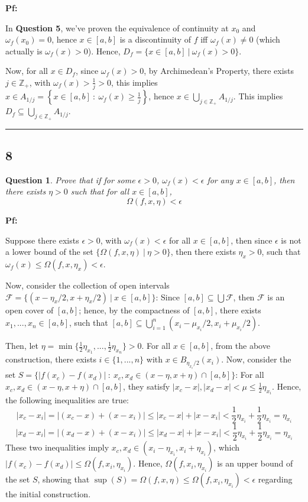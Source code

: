 \documentclass{article}
\newtheorem{question}{Question}
\begin{document}
\textbf{Pf:}

In \textbf{Question 5}, we've proven the equivalence of continuity at $x_0$ and $\omega_f(x_0)=0$, hence $x\in[a,b]$ is a discontinuity of $f$
iff $\omega_f(x)\neq 0$ (which actually is $\omega_f(x)>0$). Hence, $D_f=\{x\in[a,b]\ |\ \omega_f(x)>0\}$.

Now, for all $x\in D_f$, since $\omega_f(x)>0$, by Archimedean's Property, there exists $j\in\mathbb{Z}_+$, with $\omega_f(x)>\frac{1}{j}>0$,
this implies $x\in A_{1/j}=\left\{x\in[a,b]\ :\ \omega_f(x)\geq \frac{1}{j}\right\}$, hence $x\in \bigcup_{j\in\mathbb{Z}_+}A_{1/j}$. This implies $D_f\subseteq \bigcup_{j\in\mathbb{Z}_+}A_{1/j}$.

\hfill

\rule{15.5cm}{0.1mm}

\break

\subsection*{8}
\begin{myBox2}[]{}
    \begin{question}
        Prove that if for some $\epsilon>0$, $\omega_f(x)<\epsilon$ for any $x\in[a,b]$, then
        there exists $\eta>0$ such that for all $x\in[a,b]$,
        $$\Omega(f,x,\eta)<\epsilon$$
    \end{question}
\end{myBox2}

\textbf{Pf:}

Suppose there exists $\epsilon>0$, with $\omega_f(x)<\epsilon$ for all $x\in[a,b]$, then since $\epsilon$ is not a lower bound of the set $\{\Omega(f,x,\eta)\ |\ \eta>0\}$,
then there exists $\eta_x>0$, such that $\omega_f(x)\leq \Omega(f,x,\eta_x)<\epsilon$.

Now, consider the collection of open intervals $\mathcal{F}=\{(x-\eta_x/2,x+\eta_x/2)\ |\ x\in[a,b]\}$: Since $[a,b]\subseteq \bigcup\mathcal{F}$, then $\mathcal{F}$ is an open cover of $[a,b]$;
hence, by the compactness of $[a,b]$, there exists $x_1,...,x_n\in [a,b]$, such that $[a,b]\subseteq \bigcup_{i=1}^{n}(x_i-\mu_{x_i}/2,x_i+\mu_{x_i}/2)$.

\hfill

Then, let $\eta=\min\{\frac{1}{2}\eta_{x_1},...,\frac{1}{2}\eta_{x_n}\}>0$. For all $x\in[a,b]$, from the above construction, there exists $i\in\{1,...,n\}$ with $x\in B_{\eta_{x_i}/2}(x_i)$.
Now, consider the set $S=\{|f(x_c)-f(x_d)|\ :\ x_c,x_d\in (x-\eta,x+\eta)\cap [a,b]\}$:
For all $x_c,x_d\in (x-\eta,x+\eta)\cap [a,b]$, they satisfy $|x_c-x|,|x_d-x|<\mu \leq \frac{1}{2}\eta_{x_i}$. Hence, the following inequalities are true:
$$|x_c-x_i| = |(x_c-x)+(x-x_i)| \leq |x_c-x|+|x-x_i| < \frac{1}{2}\eta_{x_i}+\frac{1}{2}\eta_{x_i}=\eta_{x_i}$$
$$|x_d-x_i| = |(x_d-x)+(x-x_i)| \leq |x_d-x|+|x-x_i| < \frac{1}{2}\eta_{x_i}+\frac{1}{2}\eta_{x_i} = \eta_{x_i}$$
These two inequalities imply $x_c,x_d\in (x_i-\eta_{x_i},x_i+\eta_{x_i})$, which $|f(x_c)-f(x_d)|\leq\Omega(f,x_i,\eta_{x_i})$.
Hence, $\Omega(f,x_i,\eta_{x_i})$ is an upper bound of the set $S$, showing that $\sup(S)=\Omega(f,x,\eta)\leq \Omega(f,x_i,\eta_{x_i}) < \epsilon$ regarding the initial construction.
\end{document}
